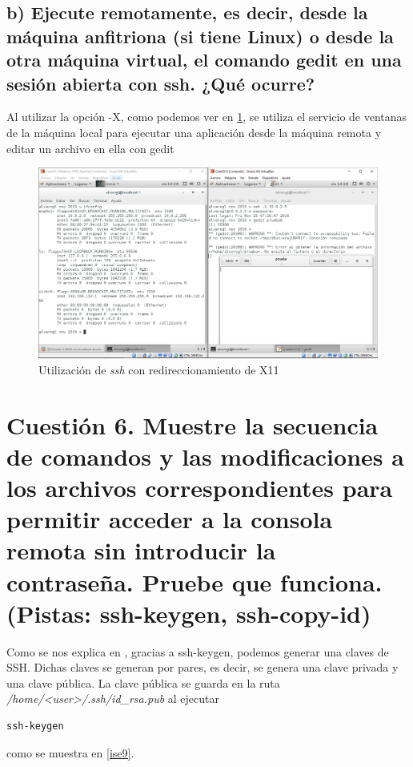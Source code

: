 \subsection{b) Ejecute remotamente, es decir, desde la máquina anfitriona (si tiene Linux) o desde la otra máquina virtual, el comando gedit en una sesión abierta con ssh. ¿Qué ocurre?}

Al utilizar la opción -X, como podemos ver en \ref{ise8}, se utiliza el servicio de ventanas de la máquina local para ejecutar una aplicación desde la máquina remota y editar un archivo en ella con gedit

\begin{figure}[H]
	\centering
	\includegraphics[scale=0.45]{ise8.png}
	\caption{Utilización de \textit{ssh} con redireccionamiento de X11} \label{ise8}
\end{figure}


\section{Cuestión 6. Muestre la secuencia de comandos y las modificaciones a los archivos correspondientes para permitir acceder a la consola remota sin introducir la contraseña. Pruebe que funciona. (Pistas: ssh-keygen, ssh-copy-id)}

Como se nos explica en \cite{ssh-keys}, gracias a ssh-keygen, podemos generar una claves de SSH. Dichas claves se generan por pares, es decir, se genera una clave privada y una clave pública. 
La clave pública se guarda en la ruta \textit{/home/<user>/.ssh/id\_rsa.pub} al ejecutar\begin{verbatim}
ssh-keygen
\end{verbatim} como se muestra en \ref{ise9}.

